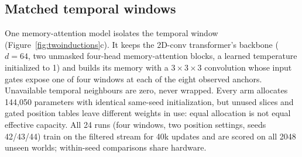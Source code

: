 \documentclass[11pt]{article}
\begin{document}
\begin{table}[h]
\centering
\caption{\textbf{Previous-frame neighbourhood and learned positions in the standard transformer.} L3 SeqAcc (\%), mean over seeds 42/43/44. Removing the position table also changes parameter count and initialization; the causal mask and the neighbourhood input still carry temporal and spatial structure. All cells share the recipe and were scored in one evaluation pass: the learned-position d64 cells and the d128 own-cell cell are the checkpoints of Table~\ref{tab:main} re-scored here (d128 own cell 0.9282/0.7681/0.8906, against 0.9263/0.7646/0.8784 in Table~\ref{tab:main} and 85.6\% in the main text), and the d128 cell with the previous-frame neighbourhood and learned positions comes from three reference runs of the same recipe (1.0/1.0/0.9990).}
\label{tab:e15pair}
\small
{}
\end{table}

\subsection{Matched temporal windows}

One memory-attention model isolates the temporal window (Figure~\ref{fig:twoinductions}c). It keeps the 2D-conv transformer's backbone ($d=64$, two unmasked four-head memory-attention blocks, a learned temperature initialized to 1) and builds its memory with a $3{\times}3{\times}3$ convolution whose input gates expose one of four windows at each of the eight observed anchors. Unavailable temporal neighbours are zero, never wrapped. Every arm allocates 144{,}050 parameters with identical same-seed initialization, but unused slices and gated position tables leave different weights in use: equal allocation is not equal effective capacity. All 24 runs (four windows, two position settings, seeds 42/43/44) train on the filtered stream for 40k updates and are scored on all 2048 unseen worlds; within-seed comparisons share hardware.
\end{document}

